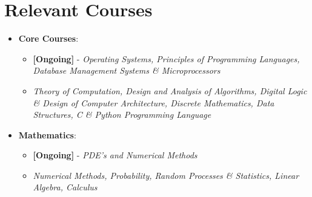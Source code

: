 \documentclass[letterpaper,11pt]{article}
\newcommand{\resumeItem}[2]{
    \item\small{
        \textbf{#1}{: #2 \vspace{-2pt}}
    }
}
\newcommand{\resumeItemListStart}{\begin{itemize}}
\newcommand{\resumeItemListEnd}{\end{itemize}\vspace{-5pt}}
\begin{document}
\section{Relevant Courses}
    		\resumeItemListStart
	    		\resumeItem{Core Courses}
	    			{}
	    			\begin{itemize}
					\item{\textbf{[Ongoing]} - \textit{Operating Systems, Principles of Programming Languages, Database Management Systems \& Microprocessors}}
					\item{\textit{Theory of Computation, Design and Analysis of Algorithms, Digital Logic \& Design of Computer Architecture, Discrete Mathematics, Data Structures, C \& Python Programming Language}}
                 \end{itemize}
               \resumeItem{Mathematics}
	    			{}
	    			\begin{itemize}
					\item{\textbf{[Ongoing]} - \textit{PDE's and Numerical Methods}}
					\item{\textit{Numerical Methods, Probability, Random Processes \& Statistics, Linear Algebra, Calculus}}
                 \end{itemize}
		    \resumeItemListEnd

\end{document}
